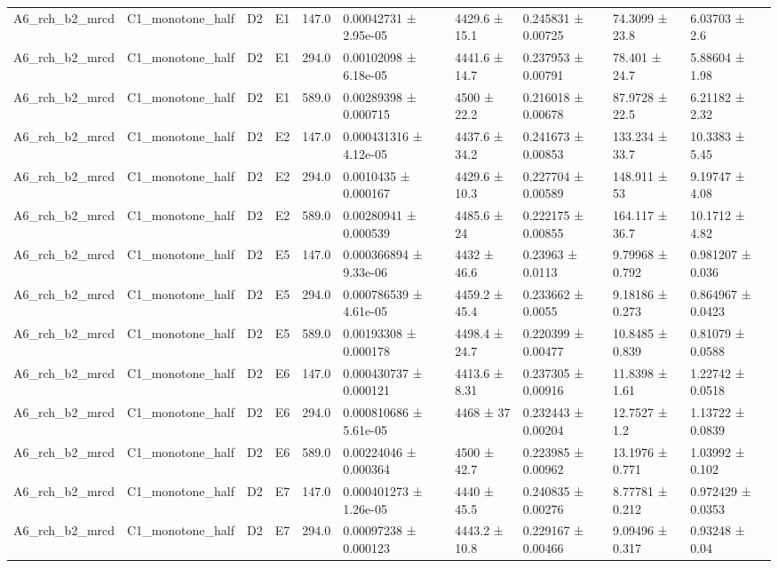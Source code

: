 \begin{table}
\begin{tabular}{llllllllll}
A6\_rch\_b2\_mrcd & C1\_monotone\_half & D2 & E1 & 147.0 & 0.00042731 ± 2.95e-05 & 4429.6 ± 15.1 & 0.245831 ± 0.00725 & 74.3099 ± 23.8 & 6.03703 ± 2.6 \\
A6\_rch\_b2\_mrcd & C1\_monotone\_half & D2 & E1 & 294.0 & 0.00102098 ± 6.18e-05 & 4441.6 ± 14.7 & 0.237953 ± 0.00791 & 78.401 ± 24.7 & 5.88604 ± 1.98 \\
A6\_rch\_b2\_mrcd & C1\_monotone\_half & D2 & E1 & 589.0 & 0.00289398 ± 0.000715 & 4500 ± 22.2 & 0.216018 ± 0.00678 & 87.9728 ± 22.5 & 6.21182 ± 2.32 \\
A6\_rch\_b2\_mrcd & C1\_monotone\_half & D2 & E2 & 147.0 & 0.000431316 ± 4.12e-05 & 4437.6 ± 34.2 & 0.241673 ± 0.00853 & 133.234 ± 33.7 & 10.3383 ± 5.45 \\
A6\_rch\_b2\_mrcd & C1\_monotone\_half & D2 & E2 & 294.0 & 0.0010435 ± 0.000167 & 4429.6 ± 10.3 & 0.227704 ± 0.00589 & 148.911 ± 53 & 9.19747 ± 4.08 \\
A6\_rch\_b2\_mrcd & C1\_monotone\_half & D2 & E2 & 589.0 & 0.00280941 ± 0.000539 & 4485.6 ± 24 & 0.222175 ± 0.00855 & 164.117 ± 36.7 & 10.1712 ± 4.82 \\
A6\_rch\_b2\_mrcd & C1\_monotone\_half & D2 & E5 & 147.0 & 0.000366894 ± 9.33e-06 & 4432 ± 46.6 & 0.23963 ± 0.0113 & 9.79968 ± 0.792 & 0.981207 ± 0.036 \\
A6\_rch\_b2\_mrcd & C1\_monotone\_half & D2 & E5 & 294.0 & 0.000786539 ± 4.61e-05 & 4459.2 ± 45.4 & 0.233662 ± 0.0055 & 9.18186 ± 0.273 & 0.864967 ± 0.0423 \\
A6\_rch\_b2\_mrcd & C1\_monotone\_half & D2 & E5 & 589.0 & 0.00193308 ± 0.000178 & 4498.4 ± 24.7 & 0.220399 ± 0.00477 & 10.8485 ± 0.839 & 0.81079 ± 0.0588 \\
A6\_rch\_b2\_mrcd & C1\_monotone\_half & D2 & E6 & 147.0 & 0.000430737 ± 0.000121 & 4413.6 ± 8.31 & 0.237305 ± 0.00916 & 11.8398 ± 1.61 & 1.22742 ± 0.0518 \\
A6\_rch\_b2\_mrcd & C1\_monotone\_half & D2 & E6 & 294.0 & 0.000810686 ± 5.61e-05 & 4468 ± 37 & 0.232443 ± 0.00204 & 12.7527 ± 1.2 & 1.13722 ± 0.0839 \\
A6\_rch\_b2\_mrcd & C1\_monotone\_half & D2 & E6 & 589.0 & 0.00224046 ± 0.000364 & 4500 ± 42.7 & 0.223985 ± 0.00962 & 13.1976 ± 0.771 & 1.03992 ± 0.102 \\
A6\_rch\_b2\_mrcd & C1\_monotone\_half & D2 & E7 & 147.0 & 0.000401273 ± 1.26e-05 & 4440 ± 45.5 & 0.240835 ± 0.00276 & 8.77781 ± 0.212 & 0.972429 ± 0.0353 \\
A6\_rch\_b2\_mrcd & C1\_monotone\_half & D2 & E7 & 294.0 & 0.00097238 ± 0.000123 & 4443.2 ± 10.8 & 0.229167 ± 0.00466 & 9.09496 ± 0.317 & 0.93248 ± 0.04 \\

\end{tabular}
\end{table}

